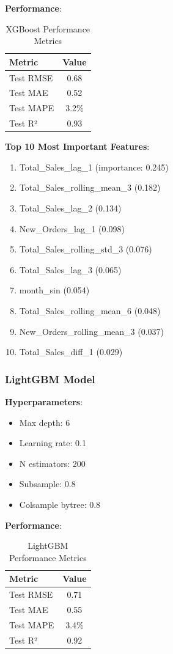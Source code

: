 \documentclass[12pt]{article}
\begin{document}
\textbf{Performance}:
\begin{table}[H]
\centering
\caption{XGBoost Performance Metrics}
\begin{tabular}{lc}
\toprule
Metric & Value \\
\midrule
Test RMSE & 0.68 \\
Test MAE & 0.52 \\
Test MAPE & 3.2\% \\
Test R² & 0.93 \\
\bottomrule
\end{tabular}
\end{table}

\textbf{Top 10 Most Important Features}:
\begin{enumerate}
    \item Total\_Sales\_lag\_1 (importance: 0.245)
    \item Total\_Sales\_rolling\_mean\_3 (0.182)
    \item Total\_Sales\_lag\_2 (0.134)
    \item New\_Orders\_lag\_1 (0.098)
    \item Total\_Sales\_rolling\_std\_3 (0.076)
    \item Total\_Sales\_lag\_3 (0.065)
    \item month\_sin (0.054)
    \item Total\_Sales\_rolling\_mean\_6 (0.048)
    \item New\_Orders\_rolling\_mean\_3 (0.037)
    \item Total\_Sales\_diff\_1 (0.029)
\end{enumerate}

\subsubsection*{LightGBM Model}

\textbf{Hyperparameters}:
\begin{itemize}
    \item Max depth: 6
    \item Learning rate: 0.1
    \item N estimators: 200
    \item Subsample: 0.8
    \item Colsample bytree: 0.8
\end{itemize}

\textbf{Performance}:
\begin{table}[H]
\centering
\caption{LightGBM Performance Metrics}
\begin{tabular}{lc}
\toprule
Metric & Value \\
\midrule
Test RMSE & 0.71 \\
Test MAE & 0.55 \\
Test MAPE & 3.4\% \\
Test R² & 0.92 \\
\bottomrule
\end{tabular}
\end{table}
\end{document}
